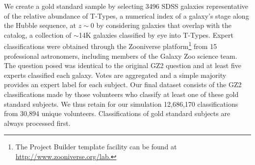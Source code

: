 \documentclass[twocolumn]{aastex6}
\begin{document}


We create a gold standard sample by selecting 3496 SDSS galaxies 
representative of the relative abundance of T-Types, a numerical index of a galaxy's stage along 
the Hubble sequence, at $z\sim0$ by considering galaxies that overlap 
with the~\cite{NairAbraham2010} catalog, a collection of $\sim$14K galaxies 
classified by eye into T-Types. 
Expert classifications were obtained through the Zooniverse platform\footnote{The Project Builder template facility can be found at \url{http://www.zooniverse.org/lab.}}  
from 15 professional astronomers, including members of the Galaxy Zoo science team. 
 The question posed was identical to the original GZ2 question and at least five 
experts classified each galaxy. 
Votes are aggregated and a simple majority provides an expert label for each subject. 
Our final dataset consists of the GZ2 classifications made 
by those volunteers who classify at least one of these gold standard subjects. 
We thus retain for our simulation 12,686,170 classifications from 30,894 unique volunteers. 
Classifications of gold standard subjects are always processed first. 
\end{document}
